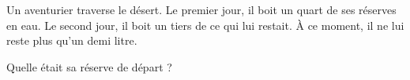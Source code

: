 
\begin{exercice}\label{exoPremiere-0006}

    Un aventurier traverse le désert. Le premier jour, il boit un quart de ses réserves en eau. Le second jour, il boit un tiers de ce qui lui restait. À ce moment, il ne lui reste plus qu'un demi litre.

    Quelle était sa réserve de départ ?

\end{exercice}
